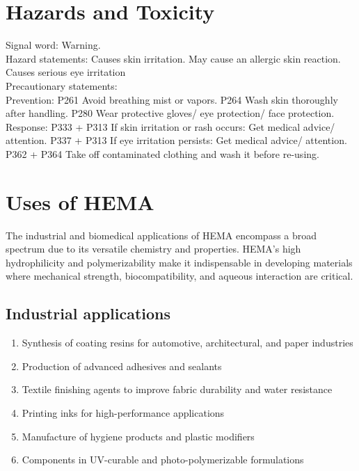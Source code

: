 \documentclass[12pt,a4paper]{report}
\begin{document}
\section{Hazards and Toxicity}
Signal word: Warning.
\\ Hazard statements: Causes skin irritation. May cause an allergic skin reaction. Causes serious
eye irritation
\\ Precautionary statements: 
\\ Prevention: P261 Avoid breathing mist or vapors. P264 Wash skin thoroughly after handling. P280 Wear protective gloves/ eye protection/ face protection.
Response: P333 + P313 If skin irritation or rash occurs: Get medical advice/ attention. P337 +
P313 If eye irritation persists: Get medical advice/ attention. P362 + P364 Take off contaminated
clothing and wash it before re-using.

\section{Uses of HEMA}
The industrial and biomedical applications of HEMA encompass
a broad spectrum due to its versatile chemistry and properties. HEMA’s high hydrophilicity and
polymerizability make it indispensable in developing materials where mechanical strength,
biocompatibility, and aqueous interaction are critical.

\subsection{Industrial applications}
	\begin{enumerate}
		\item {Synthesis of coating resins for automotive, architectural, and paper industries}
		\item {Production of advanced adhesives and sealants}
		\item {Textile finishing agents to improve fabric durability and water resistance}
		\item {Printing inks for high-performance applications}
		\item { Manufacture of hygiene products and plastic modifiers}
		\item {Components in UV-curable and photo-polymerizable formulations}
	\end{enumerate}
\end{document}

